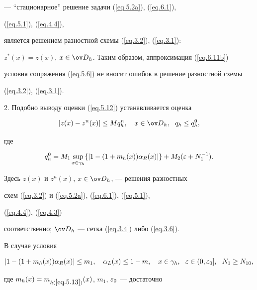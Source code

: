 

--- ``стационарное'' решение задачи (\ref{eq.5.2a}), (\ref{eq.6.1}),


(\ref{eq.5.1}), (\ref{eq.4.4}),


является решением разностной схемы (\ref{eq.3.2}), (\ref{eq.3.1}):


$z^*(x)=z(x)$, $x\in\od_h$. Таким образом, аппроксимация (\ref{eq.6.11b})


условия сопряжения (\ref{eq.5.6}) не вносит ошибок в решение разностной схемы


(\ref{eq.3.2}), (\ref{eq.3.1}).


\medskip





2. Подобно выводу оценки (\ref{eq.5.12}) устанавливается оценка


\begin{equation} \label{eq.6.2}


|z(x)-z^n(x)|\le M q^n_h, \quad x\in\od_h, \ \ q_h\le q^0_h,


\end{equation}


где


$$


q^0_h=M_1 \sup\limits_{x\in\gamma_h}


\{ |1-(1+m_h(x))\al_R(x)|\}+M_2(\eps+N_1^{-1}).


$$


Здесь $z(x)$ и $z^n(x)$,  $x\in\od_h$, --- решения разностных


схем (\ref{eq.3.2}) и (\ref{eq.5.2a}), (\ref{eq.6.1}), (\ref{eq.5.1}),


(\ref{eq.4.4}), (\ref{eq.4.3})


соответственно; $\od_h$ --- сетка (\ref{eq.3.4}) либо (\ref{eq.3.6}).





В случае условия


\begin{equation}


\label{eq.6.3}


|1-(1+m_h(x))\al_R(x)|\le m_1, \quad \al_L(x) \leq 1-m,\quad


x\in\gamma_h, \ \ \eps\in (0, \eps_0], \ \ N_1\geq N_{10}, 


\end{equation}


где $m_h(x)=m_{h(\ref{eq.5.13})}(x)$, $m_1$, $\varepsilon_0$ --- достаточно 


